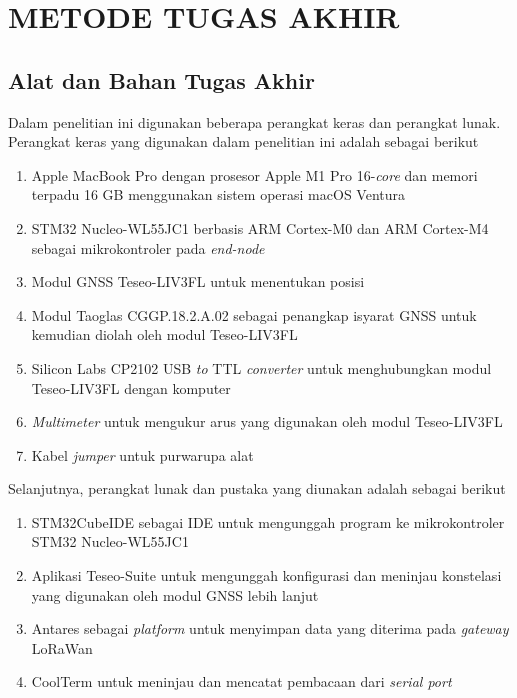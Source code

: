\chapter{METODE TUGAS AKHIR}

\section{Alat dan Bahan Tugas Akhir}
Dalam penelitian ini digunakan beberapa perangkat keras dan perangkat lunak. Perangkat keras yang digunakan dalam penelitian ini adalah sebagai berikut
\begin{enumerate}
	\item Apple MacBook Pro dengan prosesor Apple M1 Pro 16-\textit{core} dan memori terpadu 16 GB menggunakan sistem operasi macOS Ventura
	\item STM32 Nucleo-WL55JC1 berbasis ARM Cortex-M0 dan ARM Cortex-M4 sebagai mikrokontroler pada \textit{end-node}
	\item Modul GNSS Teseo-LIV3FL untuk menentukan posisi
	\item Modul Taoglas CGGP.18.2.A.02 sebagai penangkap isyarat GNSS untuk kemudian diolah oleh modul Teseo-LIV3FL
	\item Silicon Labs CP2102 USB \textit{to} TTL \textit{converter} untuk menghubungkan modul Teseo-LIV3FL dengan komputer
	\item \textit{Multimeter} untuk mengukur arus yang digunakan oleh modul Teseo-LIV3FL
	\item Kabel \textit{jumper} untuk purwarupa alat
\end{enumerate}
Selanjutnya, perangkat lunak dan pustaka yang diunakan adalah sebagai berikut
\begin{enumerate}
	\item STM32CubeIDE sebagai IDE untuk mengunggah program ke mikrokontroler STM32 Nucleo-WL55JC1
	\item Aplikasi Teseo-Suite untuk mengunggah konfigurasi dan meninjau konstelasi yang digunakan oleh modul GNSS lebih lanjut
	\item Antares sebagai \textit{platform} untuk menyimpan data yang diterima pada \textit{gateway} LoRaWan
	\item CoolTerm untuk meninjau dan mencatat pembacaan dari \textit{serial port}
\end{enumerate}

